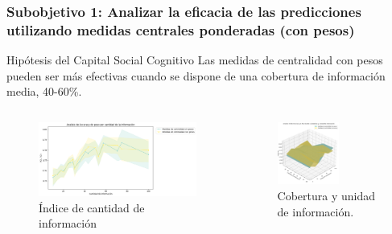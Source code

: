 \documentclass{beamer}
\begin{document}
\begin{frame}
	\frametitle{Subobjetivo 1: Analizar la eficacia de las predicciones utilizando medidas centrales ponderadas (con pesos)}
\begin{block}{Hipótesis del Capital Social Cognitivo}
Las medidas de centralidad con pesos pueden ser más efectivas cuando se dispone de una cobertura de información media, 40-60\%.
\end{block}
		\begin{columns}[c]
	\begin{column}{.5\textwidth}
		\begin{figure}
			\centering
			\includegraphics[width=1\textwidth]{figs/cap7/figura_36}
\caption{Índice de cantidad de información}
		\end{figure}      
	\end{column}
	\begin{column}{.5\textwidth}
		\begin{figure}
			\centering
			\includegraphics[width=0.6\textwidth]{figs/cap7/figura_37}
			\caption{Cobertura y unidad de información.}
		\end{figure}
	\end{column}
\end{columns}

	
	
\end{frame}
\end{document}
